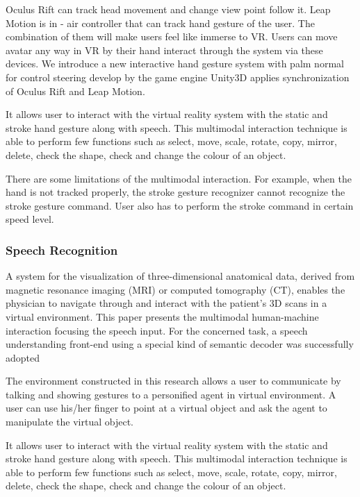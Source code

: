 Oculus Rift can track head movement and change view point follow it. Leap Motion is in - air controller that can track hand gesture of the user. The combination of them will make users feel like immerse to VR. Users can move avatar any way in VR by their hand interact through the system via these devices. We introduce a new interactive hand gesture system with palm normal for control steering develop by the game engine Unity3D applies synchronization of Oculus Rift and Leap Motion.
\cite{Khundam2015a}

It allows user to interact with the virtual reality system with the static and stroke hand gesture along with speech. This multimodal interaction technique is able to perform few functions such as select, move, scale, rotate, copy, mirror, delete, check the shape, check and change the colour of an object.
\cite{Chun2015}

There are some limitations of the multimodal interaction. For example, when the hand is not tracked properly, the stroke gesture recognizer cannot recognize the stroke gesture command. User also has to perform the stroke command in certain speed level.
\cite{Chun2015}

\subsubsection{Speech Recognition}

A system for the visualization of three-dimensional anatomical data, derived from magnetic resonance imaging (MRI) or computed tomography (CT), enables the physician to navigate through and interact with the patient's 3D scans in a virtual environment. This paper presents the multimodal human-machine interaction focusing the speech input. For the concerned task, a speech understanding front-end using a special kind of semantic decoder was successfully adopted
\cite{Muller1998}

The environment constructed in this research allows a user to communicate by talking and showing gestures
to a personified agent in virtual environment. A user can use his/her finger to point at a virtual object and ask the agent to manipulate the virtual object.
\cite{Uchino2008}

It allows user to interact with the virtual reality system with the static and stroke hand gesture along with speech. This multimodal interaction technique is able to perform few functions such as select, move, scale, rotate, copy, mirror, delete, check the shape, check and change the colour of an object.
\cite{Chun2015}


